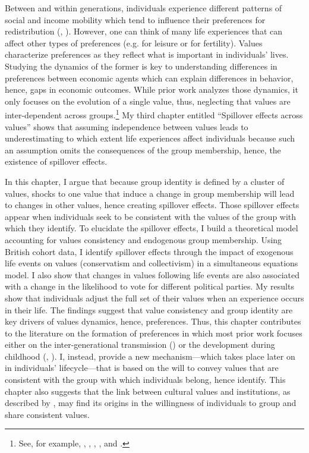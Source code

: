 Between and within generations, individuals experience different patterns of social and income mobility which tend to influence their preferences for redistribution (\citealt{Piketty1995Social}, \citealt{Alesina2018Intergenerational}). However, one can think of many life experiences that can affect other types of preferences (e.g. for leisure or for fertility). Values characterize preferences as they reflect what is important in individuals' lives. Studying the dynamics of the former is key to understanding differences in preferences between economic agents which can explain differences in behavior, hence, gaps in economic outcomes. While prior work analyzes those dynamics, it only focuses on the evolution of a single value, thus, neglecting that values are inter-dependent across groups.\footnote{See, for example, \citet{Bolzendahl2004Feminist}, \citet{Cunningham2005Reciprocal}, \citet{Fernandez2007Women}, \citet{Washington2008Female}, and \citet{Grinza2017Entry}.} My third chapter entitled ``Spillover effects across values'' shows that assuming independence between values leads to underestimating to which extent life experiences affect individuals because such an assumption omits the consequences of the group membership, hence, the existence of spillover effects.

In this chapter, I argue that because group identity is defined by a cluster of values, shocks to one value that induce a change in group membership will lead to changes in other values, hence creating spillover effects. 
Those spillover effects appear when individuals seek to be consistent with the values of the group with which they identify. To elucidate the spillover effects, I build a theoretical model accounting for values consistency and endogenous group membership. Using British cohort data, I identify spillover effects through the impact of exogenous life events on values (conservatism and collectivism) in a simultaneous equations model. I also show that changes in values following life events are also associated with a change in the likelihood to vote for different political parties. My results show that individuals adjust the full set of their values when an experience occurs in their life. The findings suggest that value consistency and group identity are key drivers of values dynamics, hence, preferences. Thus, this chapter contributes to the literature on the formation of preferences in which most prior work focuses either on the inter-generational transmission (\citealt{Bisin2001Economics, Bisin2011Economics}) or the development during childhood (\citealt{Fehr2013Development}, \citealt{Doepke2017Parenting}). I, instead, provide a new mechanism---which takes place later on in individuals' lifecycle---that is based on the will to convey values that are consistent with the group with which individuals belong, hence identify. This chapter also suggests that the link between cultural values and institutions, as described by \citet{Acemoglu2021Culture}, may find its origins in the willingness of individuals to group and share consistent values.

